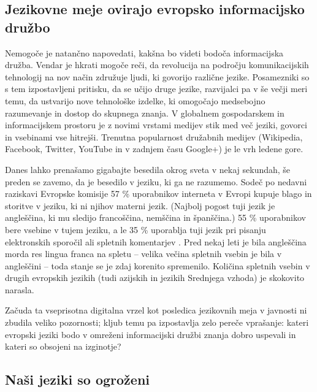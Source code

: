 \begin{multicols}{2}
\subsection{Jezikovne meje ovirajo evropsko informacij\-sko družbo}
  
Nemogoče je natančno napovedati, kakšna bo videti bodoča informacij\-ska družba. Vendar je hkrati mogoče reči, da revolucija na področju komunikacij\-skih tehnologij na nov način združuje ljudi, ki go\-vorijo različne jezike. Posamezniki so s tem izpostav\-ljeni pritisku, da se učijo druge jezike, razvijalci pa v še večji meri temu, da ustvarijo nove tehnološke izdelke, ki omogočajo medsebojno razumevanje in dostop do skupnega znanja. 
V globalnem gospodarskem in informacij\-skem prostoru je z novimi vrstami medijev stik med več jeziki, go\-vorci in vsebinami vse hitrejši. Trenutna popularnost družabnih medijev (Wikipedia, Facebook, Twitter, YouTube in v zadnjem času Google+) je le vrh ledene gore.


Danes lahko prenašamo gigabajte besedila okrog sveta v nekaj sekundah, še preden se zavemo, da je besedilo v jeziku, ki ga ne razumemo. Sodeč po nedavni raziskavi Evropske komisije 57 \% uporabnikov interneta v Evropi kupuje blago in storitve v jeziku, ki ni njihov materni jezik. (Naj\-bolj pogost tuji jezik je angleščina, ki mu sledijo francoščina, nemščina in španščina.) 55 \% uporabnikov bere vsebine v tujem jeziku, a le 35 \% uporab\-lja tuji jezik pri pisanju elektronskih sporočil ali spletnih komentarjev \cite{EC1}.  Pred nekaj leti je bila angleščina morda res lingua franca na spletu – velika večina spletnih vsebin je bila v angleščini – toda stanje se je zdaj kore\-nito spremenilo. Količina spletnih vsebin v drugih evropskih jezikih (tudi azijskih in jezikih Srednjega vzhoda) je skokovito narasla.

Začuda ta vseprisotna digitalna vrzel kot posledica jezikovnih meja v javnosti ni zbudila veliko pozornosti; kljub temu pa izpostav\-lja zelo pereče vprašanje: kateri evropski jeziki bodo v omreženi informacij\-ski družbi znanja dobro uspevali in kateri so obsojeni na izginotje?

\subsection{Naši jeziki so ogroženi}


\end{multicols}
